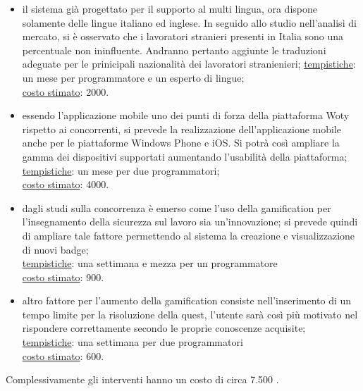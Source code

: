 \begin{itemize}
\item il sistema già progettato per il supporto al multi lingua, ora dispone solamente delle lingue italiano ed inglese. In seguido allo studio nell'analisi di mercato, si è osservato che i lavoratori stranieri presenti in Italia sono una percentuale non ininfluente. Andranno pertanto aggiunte le traduzioni adeguate per le prinicipali nazionalità dei lavoratori stranienieri;
\underline{tempistiche}: un mese per programmatore e un esperto di lingue;\\
\underline{costo stimato}: 2000\EUR.


\item essendo l'applicazione mobile uno dei punti di forza della piattaforma Woty rispetto ai concorrenti, si prevede la realizzazione dell'applicazione mobile anche per le piattaforme Windows Phone e iOS.
Si potrà così ampliare la gamma dei dispositivi supportati aumentando l'usabilità della piattaforma;\\
\underline{tempistiche}: un mese per due programmatori;\\
\underline{costo stimato}: 4000\EUR.


\item dagli studi sulla concorrenza è emerso come l'uso della gamification per l'insegnamento della sicurezza sul lavoro sia un'innovazione; si prevede quindi di ampliare tale fattore permettendo al sistema la creazione e visualizzazione di nuovi badge;\\
\underline{tempistiche}: una settimana e mezza per un programmatore\\
\underline{costo stimato}: 900\EUR.


\item altro fattore per l'aumento della gamification consiste nell’inserimento di un tempo limite per la risoluzione della quest, l'utente sarà così più motivato nel rispondere correttamente secondo le proprie conoscenze acquisite;\\
\underline{tempistiche}: una settimana per due programmatori\\
\underline{costo stimato}: 600\EUR.

\end{itemize}


Complessivamente gli interventi hanno un costo di circa 7.500 \EUR.




